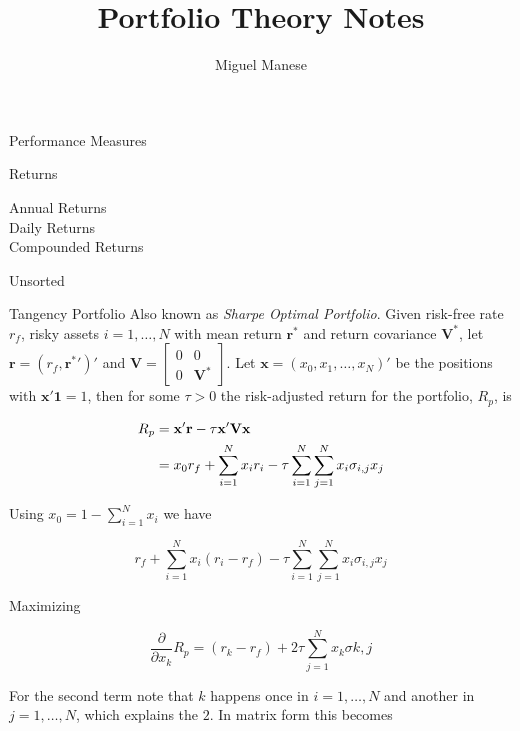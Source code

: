 \documentclass{article}
\title{Portfolio Theory Notes}
\author{Miguel Manese}
\date{}
\begin{document}
\maketitle

\begin{section}{Performance Measures}
\begin{subsection}{Returns}
\begin{description}
\item[Annual Returns] 
\item[Daily Returns] 
\item[Compounded Returns]
\end{description}
\end{subsection}

\end{section}

\begin{section}{Unsorted}
\begin{subsection}{Tangency Portfolio}
Also known as \emph{Sharpe Optimal Portfolio}. Given risk-free rate $r_f$,
risky assets $i = 1, \ldots, N$ with mean return $\mathbf{r^*}$ and return
covariance $\mathbf{V}^*$, let $\mathbf{r} = (r_f, \mathbf{r^*}')'$ and 
$\mathbf{V} = 
\begin{bmatrix}
0 & 0 \\
0 & \mathbf{V}^*
\end{bmatrix}$. Let $\mathbf{x} = (x_0, x_1, \ldots, x_N)'$ be the positions
with $\mathbf{x}'\mathbf{1} = 1$, then for some $\tau > 0$ the risk-adjusted
return for the portfolio, $R_p$, is

\begin{align}
R_p &= \mathbf{x}'\mathbf{r} - \tau \mathbf{x}'\mathbf{V}\mathbf{x} \notag\\
  & =
   x_0 r_f + \sum_{i=1}^N x_i r_i - \tau \sum_{i=1}^N \sum_{j=1}^N x_i \sigma_{i,j} x_j \notag
\end{align}

\noindent Using $x_0 = 1 - \sum_{i=1}^N x_i$ we have

\[ r_f + \sum_{i=1}^N x_i (r_i - r_f) - \tau \sum_{i=1}^N \sum_{j=1}^N x_i \sigma_{i,j} x_j \]

\noindent Maximizing

\[ \frac{\partial}{\partial x_k} R_p = 
    (r_k - r_f) + 2 \tau \sum_{j=1}^N x_k \sigma{k,j} \]

\noindent For the second term note that $k$ happens once in $i = 1, \ldots, N$
and another in $j = 1, \ldots, N$, which explains the $2$. In matrix form this
becomes


\end{subsection}
\end{section}
\end{document}

